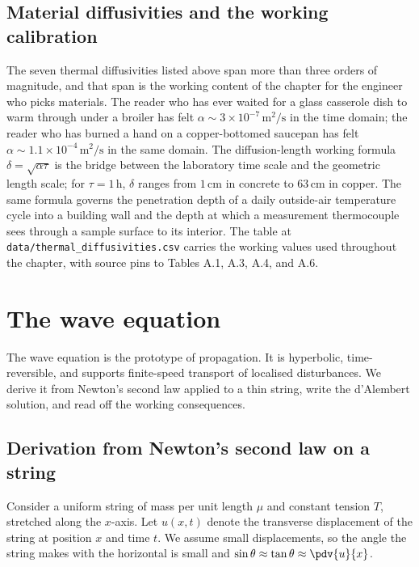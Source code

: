 \subsection{Material diffusivities and the working calibration}

The seven thermal diffusivities listed above span more than three
orders of magnitude, and that span is the working content of the
chapter for the engineer who picks materials. The reader who has
ever waited for a glass casserole dish to warm through under a
broiler has felt $\alpha \sim 3 \times 10^{-7}\,\si{\meter\squared
\per\second}$ in the time domain; the reader who has burned a
hand on a copper-bottomed saucepan has felt $\alpha \sim 1.1
\times 10^{-4}\,\si{\meter\squared\per\second}$ in the same
domain. The diffusion-length working formula $\delta = \sqrt{
\alpha \tau}$ is the bridge between the laboratory time scale and
the geometric length scale; for $\tau = 1\,\si{\hour}$, $\delta$
ranges from $1\,\si{\centi\meter}$ in concrete to $63\,\si{
\centi\meter}$ in copper. The same formula governs the
penetration depth of a daily outside-air temperature cycle into
a building wall and the depth at which a measurement
thermocouple sees through a sample surface to its interior. The
table at \texttt{data/thermal\_diffusivities.csv} carries the
working values used throughout the chapter, with source pins to
\textcite{text:incropera2007} Tables A.1, A.3, A.4, and A.6.

\section{The wave equation}

The wave equation is the prototype of propagation. It is
hyperbolic, time-reversible, and supports finite-speed transport
of localised disturbances. We derive it from Newton's second law
applied to a thin string, write the d'Alembert solution, and read
off the working consequences.

\subsection{Derivation from Newton's second law on a string}

Consider a uniform string of mass per unit length $\mu$ and
constant tension $T$, stretched along the $x$-axis. Let $u(x, t)$
denote the transverse displacement of the string at position $x$
and time $t$. We assume small displacements, so the angle the
string makes with the horizontal is small and $\sin\theta \approx
\tan\theta \approx \pdv{u}{x}$.

